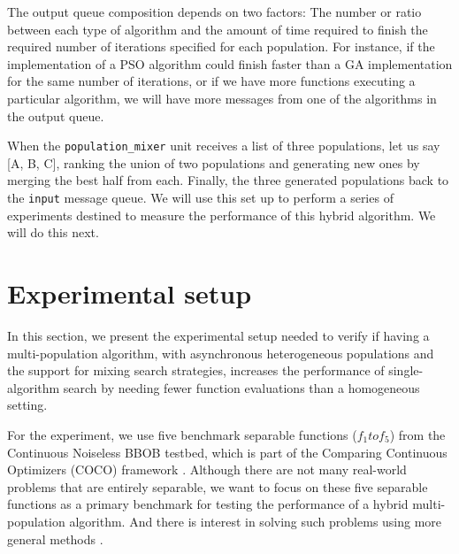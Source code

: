 \documentclass[runningheads]{llncs}
\begin{document}
The output queue composition depends on two factors:
The number or ratio between each type of algorithm and
the amount of time required to finish the required
number of iterations specified for each population.
For instance, if the implementation of a PSO algorithm
could finish faster than a GA implementation for the
same number of iterations, or if we have more
functions executing a particular algorithm, we will
have more messages from one of the algorithms in the
output queue.

When the \texttt{population\_mixer} unit receives a list of three
populations, let us say [A, B, C], ranking the union of two
populations and generating new ones by merging the best half from
each. Finally, the three generated 
populations back to the \texttt{input} message queue.
We will use this set up to perform a series of experiments destined to
measure the performance of this hybrid algorithm. We will do this next.



\section{Experimental setup}
\label{setup}

In this section, we present the experimental setup needed 
to verify if having a multi-population algorithm, with asynchronous
heterogeneous populations and the support for mixing search strategies,
increases the performance of single-algorithm search by needing fewer function evaluations
than a homogeneous setting. %

For the experiment, we use five
benchmark separable functions ($f_1 to f_5 $) from the Continuous Noiseless
BBOB testbed, which is part of the Comparing Continuous Optimizers (COCO)
framework \cite{hansen2016coco}. Although there are not many real-world
problems that are entirely separable, we want to focus on these five separable functions
as a primary benchmark for testing the performance of a hybrid multi-population
algorithm. And there is interest in solving such problems using more
general methods \cite{doerr2013evolutionary,swarzberg1994step}. %
\end{document}
